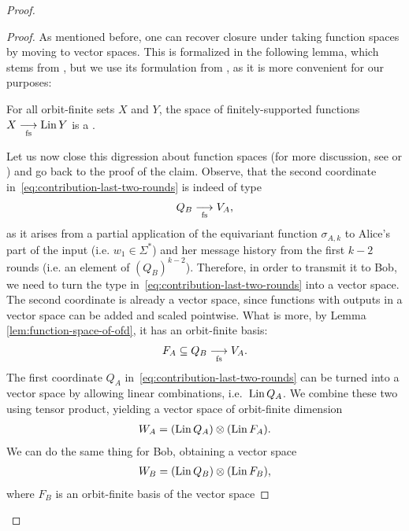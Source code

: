 \begin{proof}
\begin{proof}
      As mentioned before, one can recover closure under taking function spaces by moving to vector spaces. This is formalized in the following lemma, which stems 
      from \cite{orbitFiniteVectorTheoretics}, but we use its formulation from \cite{bojanczyk_slightly}, as it is more convenient for our purposes:
      \begin{lemma}
      \label{lem:function-space-of-ofd}
            For all orbit-finite sets $X$ and $Y$, the space of finitely-supported functions $X \underset{\text{fs}}{\longrightarrow} \operatorname{Lin} Y$ is a .
      \end{lemma}
      Let us now close this digression about function spaces (for more discussion, see \cite[Section 8.3]{bojanczyk_slightly} or \cite{functionSpaces2024})
      and go back to the proof of the claim. Observe, that the second coordinate in~\eqref{eq:contribution-last-two-rounds} is indeed of type 
      \begin{align*}
      Q_B \underset{\text{fs}}{\longrightarrow} V_A,
      \end{align*}
      as it arises from a partial application of the equivariant function $\sigma_{A,k}$ to Alice's part of the input (i.e. $w_1 \in \Sigma^*$)
      and her message history from the first $k-2$ rounds (i.e. an element of $(Q_B)^{k-2}$). Therefore, in order to transmit it to Bob, 
      we need to turn the type in~\eqref{eq:contribution-last-two-rounds} into a vector space. The second coordinate is already a vector space,
      since functions with outputs in a vector space can be added and scaled pointwise. What is more, by Lemma \ref{lem:function-space-of-ofd},
      it has an orbit-finite basis:
      \begin{align*}
        F_A \subseteq Q_B \underset{\text{fs}}{\longrightarrow} V_A.  
      \end{align*}
      The first coordinate $Q_A$ in~\eqref{eq:contribution-last-two-rounds} can be turned into a vector space by  allowing linear combinations, i.e.~$\operatorname{Lin} Q_A$. We combine these two using tensor product, yielding a vector space of orbit-finite dimension
        \begin{align*}
           W_A =  (\operatorname{Lin} Q_A) \otimes (\operatorname{Lin} F_A).
        \end{align*}
        We can do the same thing for Bob, obtaining a vector space
        \begin{align*}
           W_B =  (\operatorname{Lin} Q_B) \otimes (\operatorname{Lin} F_B),
        \end{align*}
        where $F_B$ is an orbit-finite basis of the vector space 

\end{proof}
\end{proof}

